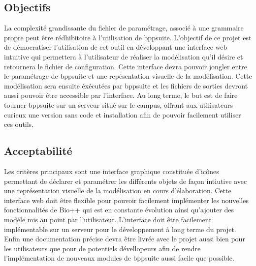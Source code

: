 	
\subsection{Objectifs}
	La complexité grandissante du fichier de paramétrage, associé à une grammaire propre peut être rédhibitoire à l'utilisation de bppsuite. L'objectif de ce projet est de démocratiser l'utilisation de cet outil en développant une interface web intuitive qui permettera à l'utilisateur de réaliser la modélisation qu'il désire et retournera le fichier de configuration. Cette interface devra pouvoir jongler entre le paramétrage de bppsuite et une repésentation visuelle de la modélisation. Cette modélisation sera ensuite éxécutées par bppsuite et les fichiers de sorties devront aussi pouvoir être accessible par l'interface. Au long terme, le but est de faire tourner bppsuite sur un serveur situé sur le campus, offrant aux utilisateurs curieux une version sans code et installation afin de pouvoir facilement utiliser ces outils.
	
\subsection{Acceptabilité}
	Les critères principaux sont une interface graphique constituée d'icônes permettant de déclarer et paramétrer les différents objets de façon intiutive avec une représentation visuelle de la modélisation en cours d'élaboration. Cette interface web doit être flexible pour pouvoir facilement implémenter les nouvelles fonctionnalités de Bio++ qui est en constante évolution ainsi qu'ajouter des modèle mis au point par l'utilisateur. L'interface doit être facilement implémentable sur un serveur pour le développement à long terme du projet.
Enfin une documentation précise devra être livrée avec le projet aussi bien pour les utilisateurs que pour de potentiels dévellopeurs
 afin de rendre l'implémentation de nouveaux modules de bppsuite aussi facile que possible.
	
